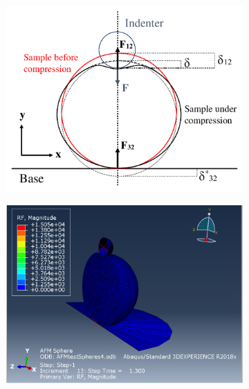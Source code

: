 \begin{figure}[H]
\centering

    \begin{subfigure}[t]{0.45\textwidth}
        \centering
        \caption{\label{fig: Double Contact Illustraction}}
        \includegraphics[width=1\linewidth]{Figures/Double Contact.pdf}
    \end{subfigure}
    \hfill
    \begin{subfigure}[t]{0.45\textwidth}
        \centering
        \caption{\label{fig: Sphere-Sphere_ABAQUS-Result}}
        \includegraphics[width=1\linewidth]{Figures/Sphere-Sphere_Result.png}    
    \end{subfigure}


\end{figure}
